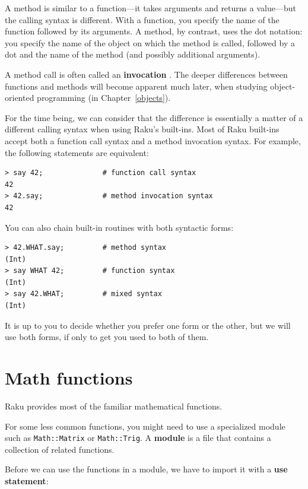 A method is similar to a function---it takes arguments and
returns a value---but the calling syntax is different. With 
a function, you specify the name of the function followed 
by its arguments. A method, by contrast, uses the dot 
notation: you specify the name of the object on which 
the method is called, followed by a dot and the name of 
the method (and possibly additional arguments).

A method call is often called an {\bf invocation}
. The deeper differences between functions and
methods will become apparent much later, when studying 
object-oriented programming (in Chapter~\ref{objects}).

For the time being, we can consider that the difference is 
essentially a matter of a different calling syntax when using Raku's 
built-ins. Most of Raku built-ins accept both a function 
call syntax and a method invocation syntax. For example, 
the following statements are equivalent:

\begin{verbatim}
> say 42;              # function call syntax
42
> 42.say;              # method invocation syntax
42
\end{verbatim}
%

You can also chain built-in routines with both syntactic 
forms:

\begin{verbatim}
> 42.WHAT.say;         # method syntax
(Int)
> say WHAT 42;         # function syntax
(Int)
> say 42.WHAT;         # mixed syntax
(Int)
\end{verbatim}
%

It is up to you to decide whether you prefer one form or the 
other, but we will use both forms, if only to get you used to 
both of them.

\section{Math functions}

Raku provides most of the familiar mathematical functions.

For some less common functions, you might need to use a 
specialized module such as \verb'Math::Matrix' or 
\verb'Math::Trig'.  A {\bf module} is a file that contains a
collection of related functions.

Before we can use the functions in a module, we have to import it with
a {\bf use statement}:

